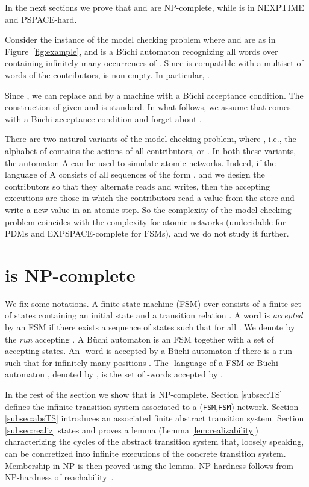 \documentclass{llncs}
\begin{document}
In the next sections we prove that 
and  are NP-complete, 
while  is in NEXPTIME and PSPACE-hard. 

\begin{example}
Consider the instance of the model checking problem where  and  are as in Figure~\ref{fig:example},
and  is a B\"uchi automaton recognizing all words over  containing infinitely many 
occurrences of . Since  is compatible with a multiset of words of the contributors, 
 is non-empty. In particular, .
\end{example}

Since , we can replace  and  by a
machine  with a B\"uchi acceptance condition. The construction
of  given  and  is standard.
In what follows, we assume that  comes with a B\"uchi acceptance condition and forget about .

There are two natural variants of the model checking problem, where , i.e., the alphabet of  contains the actions of all
contributors, or .  In both these
variants, the automaton A can be used to simulate atomic networks.  Indeed, if
the language of A consists of all sequences of the form , and we design the contributors so that they alternate reads
and writes, then the accepting executions are those in which the contributors
read a value from the store and write a new value in an atomic step. So the
complexity of the model-checking problem coincides with the complexity for
atomic networks (undecidable for PDMs and EXPSPACE-complete for FSMs), and we
do not study it further.



\makeatletter{}

\section{ is NP-complete}
\label{sec:fsafsa}

We fix some notations. A finite-state machine (FSM)  over  consists of a
finite set of states  containing an initial state  and a transition
relation .
A word  is \emph{accepted} by an
FSM if there exists a
sequence  of states such that
 for all . We denote by  the \emph{run} accepting .  
A B\"uchi automaton  is an FSM  
together with a set  of accepting
states. An -word  is accepted by a B\"uchi automaton if there is a run  such that   for infinitely many positions .
The -language of a FSM or B\"uchi automaton , denoted by , is the set of -words accepted by .

In the rest of the section we show that  is NP-complete. 
Section \ref{subsec:TS} defines the infinite
transition system associated to a (\texttt{FSM},\texttt{FSM})-network. Section \ref{subsec:absTS} introduces
an associated finite abstract transition system. Section \ref{subsec:realiz} states and proves 
a lemma (Lemma \ref{lem:realizability}) characterizing the cycles of the
abstract transition system that, loosely speaking, can be concretized into
infinite executions of the concrete transition system. Membership in NP is then proved using the lemma. 
NP-hardness follows from NP-hardness of
reachability~\cite{egm13}. 
\end{document}
